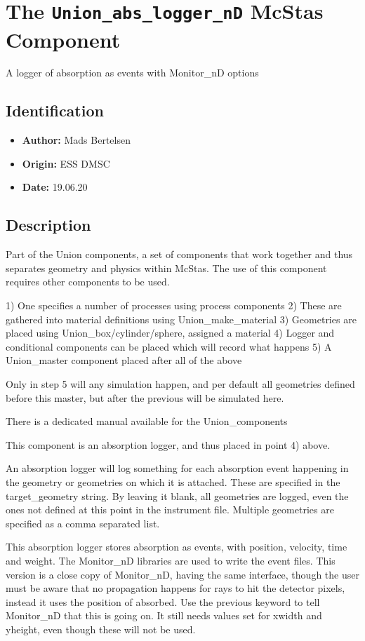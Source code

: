 \section{The \texttt{Union\_abs\_logger\_nD} McStas Component}
A logger of absorption as events with Monitor\_nD options

\subsection*{Identification}
\begin{itemize}
  \item \textbf{Author:} Mads Bertelsen
  \item \textbf{Origin:} ESS DMSC
  \item \textbf{Date:} 19.06.20
\end{itemize}

\subsection*{Description}
Part of the Union components, a set of components that work together and thus separates geometry and physics within McStas. The use of this component requires other components to be used.

1) One specifies a number of processes using process components 2) These are gathered into material definitions using Union\_make\_material 3) Geometries are placed using Union\_box/cylinder/sphere, assigned a material 4) Logger and conditional components can be placed which will record what happens 5) A Union\_master component placed after all of the above

Only in step 5 will any simulation happen, and per default all geometries defined before this master, but after the previous will be simulated here.

There is a dedicated manual available for the Union\_components

This component is an absorption logger, and thus placed in point 4) above.

An absorption logger will log something for each absorption event happening in the geometry or geometries on which it is attached. These are specified in the target\_geometry string. By leaving it blank, all geometries are logged, even the ones not defined at this point in the instrument file. Multiple geometries are specified as a comma separated list.

This absorption logger stores absorption as events, with position, velocity, time and weight. The Monitor\_nD libraries are used to write the event files. This version is a close copy of Monitor\_nD, having the same interface, though the user must be aware that no propagation happens for rays to hit the detector pixels, instead it uses the position of absorbed. Use the previous keyword to tell Monitor\_nD that this is going on. It still needs values set for xwidth and yheight, even though these will not be used.

